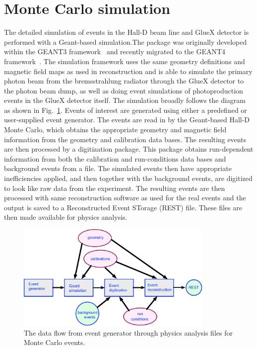 \section[Monte Carlo (Richard)]{Monte Carlo simulation \label{sec:simulation}}
The detailed simulation of events in the Hall-D beam line and GlueX detector is performed with a Geant-based simulation.The package was originally developed within the GEANT3 framework~\cite{Brun:1987ma} and recently migrated to the GEANT4 framework~\cite{Agostinelli:2002hh,Allison:2016lfl}. The simulation framework uses the same geometry definitions and magnetic field maps as used in reconstruction and is able to simulate the primary photon beam from the bremsstrahlung radiator through the GlueX detector to the photon beam dump, as well as doing event simulations of photoproduction events in the GlueX detector itself. The simulation broadly follows the diagram as shown in Fig.~\ref{fig:MC-data-flow}. Events of interest are generated using either a predefined or user-supplied event generator. The events are read in by the Geant-based Hall-D Monte Carlo, which obtains the appropriate geometry and magnetic field information from the geometry and calibration data bases. The resulting events are then processed by a digitization package. This package obtains run-dependent information from both the calibration and run-conditions data bases and background events from a file. The simulated events then have appropriate inefficiencies applied, and then together with the background events, are digitized to look like raw data from the experiment. The resulting events are then processed with same reconstruction software as used for the real events and the output is saved to a Reconstructed Event STorage (REST) file. These files are then made available for physics analysis.
\begin{figure}[h!]\centering
\includegraphics[width=0.85\textwidth]{figures/MC-data-flow.pdf}
\caption[]{\label{fig:MC-data-flow}The data flow from event generator through physics analysis files for Monte Carlo events.}
\end{figure}

